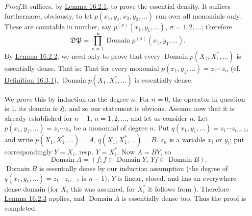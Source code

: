 \documentclass[12pt,b5paper,twoside]{article}
\newcommand{\Hspace}{\mathfrak H}
\newcommand{\Proof}{\par\noindent\textit{Proof:}\enspace}
\newcommand{\defref}[1]{\hyperref[def:#1]{Definition #1}}
\newcommand{\lemref}[1]{\hyperref[lem:#1]{Lemma #1}}
\begin{document}
\Proof It suffices, by \lemref{16.2.1}, to prove the essential density. It
suffices furthermore, obviously, to let \(p(x_1,y_1,x_2,y_2,\ldots)\) run
over all monomials only. These are countable in number, say
\(p^{(\sigma)}(x_1,y_1,\ldots)\), \(\sigma=1,2,\ldots\); therefore
\[
\mathfrak D\mathfrak P
=\prod_{\sigma=1}^{\infty}
 \operatorname{Domain}p^{(\sigma)}(x_1,y_1,\ldots).
\]
By \lemref{16.2.2}, we need only to prove that every
\(\operatorname{Domain}p(X_1,X_1^*,\ldots)\) is essentially dense. That is:
That for every monomial \(p(x_1,y_1,\ldots)=z_1\cdots z_n\) (cf.
\defref{16.3.1}), \(\operatorname{Domain}p(X_1,X_1^*,\ldots)\) is
essentially dense.

We prove this by induction on the degree \(n\). For \(n=0\), the operator in
question is \(1\), its domain is \(\Hspace\), and so our statement is
obvious. Assume now that it is already established for \(n-1\),
\(n=1,2,\ldots\), and let us consider \(n\). Let
\(p(x_1,y_1,\ldots)=z_1\cdots z_n\) be a monomial of degree \(n\). Put
\(q(x_1,y_1,\ldots)=z_1\cdots z_{n-1}\), and write
\(p(X_1,X_1^*,\ldots)=A\), \(q(X_1,X_1^*,\ldots)=B\). \(z_n\) is a
variable \(x_i\) or \(y_i\); put correspondingly \(Y=X_i\), resp.
\(Y=X_i^*\). Now \(A=BY\), so
\[
\operatorname{Domain}A=(f;f\in\operatorname{Domain}Y,
\ Yf\in\operatorname{Domain}B).
\]
\(\operatorname{Domain}B\) is essentially dense by our induction assumption
(the degree of \(q(x_1,y_1,\ldots)=z_1\cdots z_{n-1}\) is \(n-1\)); \(Y\)
is linear, closed, and has an everywhere dense domain (for \(X_i\) this was
assumed, for \(X_i^*\) it follows from \cite[p.~301]{ref21}). Therefore
\lemref{16.2.3} applies, and \(\operatorname{Domain}A\) is essentially dense
too. Thus the proof is completed.
\end{document}
